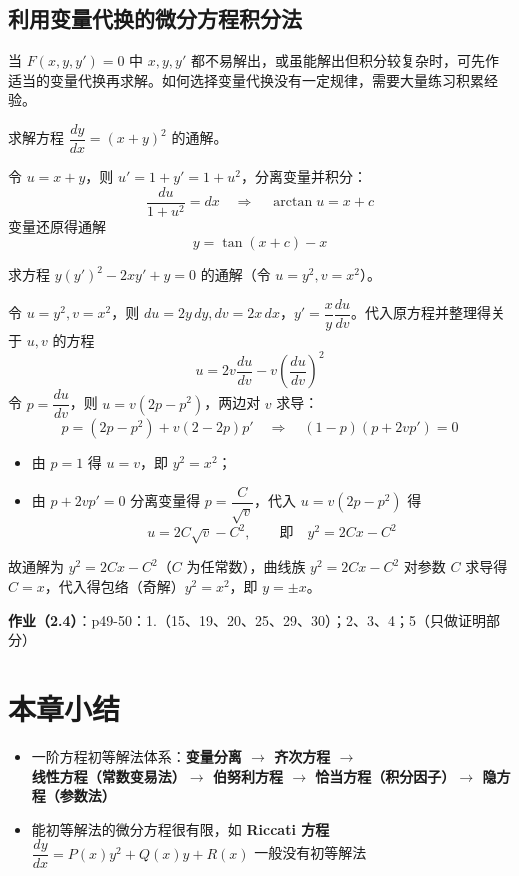\subsection{利用变量代换的微分方程积分法}

当 $F(x, y, y') = 0$ 中 $x, y, y'$ 都不易解出，或虽能解出但积分较复杂时，可先作适当的变量代换再求解。如何选择变量代换没有一定规律，需要大量练习积累经验。

\begin{example}
求解方程 $\dfrac{dy}{dx} = (x + y)^2$ 的通解。
\end{example}

\begin{solution}
令 $u = x + y$，则 $u' = 1 + y' = 1 + u^2$，分离变量并积分：
$$\frac{du}{1 + u^2} = dx \quad \Rightarrow \quad \arctan u = x + c$$
变量还原得通解
$$y = \tan(x + c) - x$$
\end{solution}

\begin{example}
求方程 $y(y')^2 - 2xy' + y = 0$ 的通解（令 $u = y^2, v = x^2$）。
\end{example}

\begin{solution}
令 $u = y^2, v = x^2$，则 $du = 2y\,dy, dv = 2x\,dx$，$y' = \dfrac{x}{y}\dfrac{du}{dv}$。代入原方程并整理得关于 $u, v$ 的方程
$$u = 2v\frac{du}{dv} - v\left(\frac{du}{dv}\right)^2$$
令 $p = \dfrac{du}{dv}$，则 $u = v(2p - p^2)$，两边对 $v$ 求导：
$$p = (2p - p^2) + v(2 - 2p)p' \quad \Rightarrow \quad (1 - p)(p + 2vp') = 0$$
\begin{itemize}
    \item 由 $p = 1$ 得 $u = v$，即 $y^2 = x^2$；
    \item 由 $p + 2vp' = 0$ 分离变量得 $p = \dfrac{C}{\sqrt{v}}$，代入 $u = v(2p-p^2)$ 得
    $$u = 2C\sqrt{v} - C^2, \qquad \text{即} \quad y^2 = 2Cx - C^2$$
\end{itemize}
故通解为 $y^2 = 2Cx - C^2$（$C$ 为任常数），曲线族 $y^2 = 2Cx - C^2$ 对参数 $C$ 求导得 $C = x$，代入得包络（奇解）$y^2 = x^2$，即 $y = \pm x$。
\end{solution}

\textbf{作业（2.4）}：p49-50：1.（15、19、20、25、29、30）；2、3、4；5（只做证明部分）

\section*{本章小结}

\begin{itemize}
    \item 一阶方程初等解法体系：\textbf{变量分离 $\rightarrow$ 齐次方程 $\rightarrow$ 线性方程（常数变易法）$\rightarrow$ 伯努利方程 $\rightarrow$ 恰当方程（积分因子）$\rightarrow$ 隐方程（参数法）}
    \item 能初等解法的微分方程很有限，如 \textbf{Riccati 方程} $\dfrac{dy}{dx} = P(x)y^2 + Q(x)y + R(x)$ 一般没有初等解法
\end{itemize}
